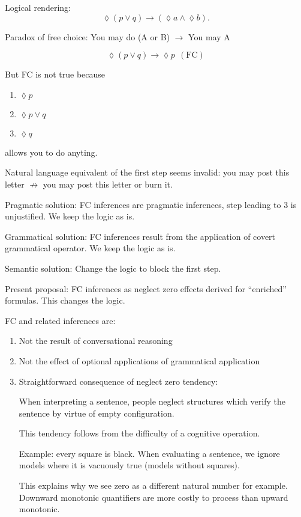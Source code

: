 Logical rendering:
\[
    \lozenge(p\vee q)\to(\lozenge a\wedge\lozenge b).
\]

Paradox of free choice: You may do (A or B) \(\to\) You may A

\[
    \lozenge (p\vee q)\to \lozenge p\>\>(\text{FC})
\]

But FC is not true because
\begin{enumerate}
    \item \(\lozenge p\)
    \item \(\lozenge p\vee q\)
    \item \(\lozenge q\)
\end{enumerate}
allows you to do anyting.

Natural language equivalent of the first step seems invalid: you may post this
letter \(\not\to\) you may post this letter or burn it.

Pragmatic solution: FC inferences are pragmatic inferences, step leading to 3 is
unjustified. We keep the logic as is.

Grammatical solution: FC inferences result from the application of covert
grammatical operator. We keep the logic as is.

Semantic solution: Change the logic to block the first step.

Present proposal: FC inferences as neglect zero effects derived for ``enriched''
formulas. This changes the logic.

FC and related inferences are:
\begin{enumerate}
    \item Not the result of conversational reasoning
    \item Not the effect of optional applications of grammatical application
    \item Straightforward consequence of neglect zero tendency:

          When interpreting a sentence, people neglect structures which verify
          the sentence by virtue of empty configuration.

          This tendency follows from the difficulty of a cognitive operation.

          Example: every square is black. When evaluating a sentence, we ignore
          models where it is vacuously true (models without squares).

          This explains why we see zero as a different natural number for
          example. Downward monotonic quantifiers are more costly to process than
          upward monotonic.
\end{enumerate}


